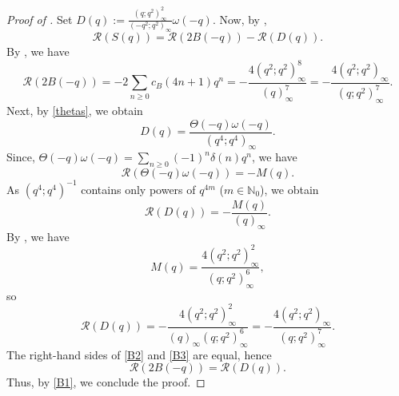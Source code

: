\documentclass[12pt,reqno]{amsart}
\renewcommand{\d}{{\delta}}
\renewcommand{\o}{{\omega}}
\renewcommand{\(}{\left\(}
\renewcommand{\)}{\right\)}
\numberwithin{equation}{section}
\theoremstyle{plain}
\theoremstyle{definition}
\numberwithin{equation}{section}
\begin{document}
\begin{proof}[Proof of ]
Set $D(q):=\frac{(q;q^2)^2_{\infty}}{(-q^2;q^2)_{\infty}}\o(-q)$. Now, by ,
\begin{equation}\label{B1}
\mathcal{R}\left(S(q)\right)=\mathcal{R}\left(2B(-q)\right)-\mathcal{R}\left(D(q)\right).
\end{equation}
By , we have 
\begin{equation}\label{B2}
\mathcal{R}\left(2B(-q)\right)=-2\sum_{n\ge 0}c_B(4n+1)q^n=-\frac{4\left(q^2;q^2\right)^8_{\infty}}{\left(q\right)^7_{\infty}}=-\frac{4\left(q^2;q^2\right)_{\infty}}{\left(q;q^2\right)^7_{\infty}}.
\end{equation}
Next, by \eqref{thetas}, we obtain 
\[
D(q)=\frac{\Theta(-q)\o(-q)}{\left(q^4;q^4\right)_{\infty}}.
\]
 Since, $\Theta(-q)\o(-q)=\sum_{n\ge 0}(-1)^n\d(n)q^n$, we have
\[
\mathcal{R}\left(\Theta(-q)\o(-q)\right)=-M(q).
\]
 As $(q^4;q^4)^{-1}$ contains only powers of $q^{4m}$ ($m\in \mathbb{N}_{ 0}$), we obtain
\[
\mathcal{R}\left(D(q)\right)=-\frac{M(q)}{\left(q\right)_{\infty}}.
\]
By , we have
\[
M(q)=\frac{4\left(q^2;q^2\right)^2_\infty}{\left(q;q^2\right)^6_\infty},
\]
so
\begin{equation}\label{B3}
\mathcal{R}\left(D(q)\right)=-\frac{4\left(q^2;q^2\right)^2_\infty}{\left(q\right)_{\infty}\left(q;q^2\right)^6_\infty}=-\frac{4\left(q^2;q^2\right)_{\infty}}{\left(q;q^2\right)^7_{\infty}}.
\end{equation}
The right-hand sides of \eqref{B2} and \eqref{B3} are equal, hence
\[
\mathcal{R}\left(2B(-q)\right)=\mathcal{R}\left(D(q)\right).
\]
Thus, by \eqref{B1}, we conclude the proof.\qedhere 





\end{proof}
\end{document}
